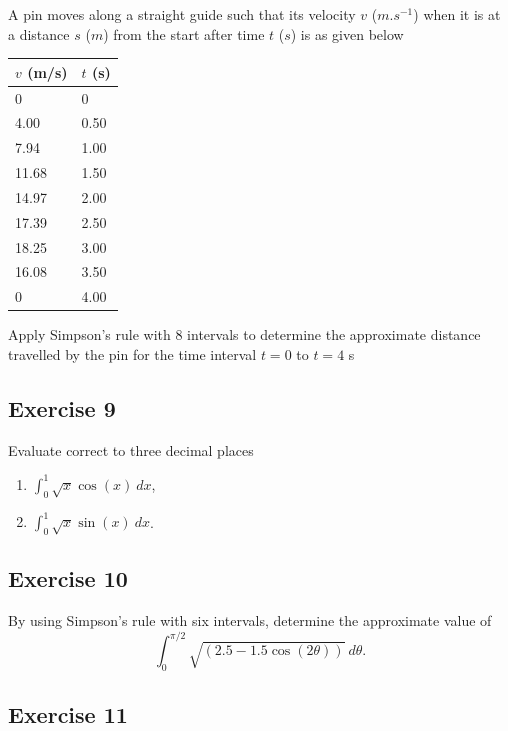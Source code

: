 \documentclass[
  11pt,
  oneside]{book}
\providecommand{\tightlist}{%
  \setlength{\itemsep}{0pt}\setlength{\parskip}{0pt}}
\newcommand{\slide}{}
\theoremstyle{definition}
\theoremstyle{definition}
\theoremstyle{definition}
\theoremstyle{definition}
\theoremstyle{remark}
\begin{document}
A pin moves along a straight guide such that its velocity \(v\) (\(m.s^{-1}\)) when it is at a distance \(s\) (\(m\)) from the start after time \(t\) (\(s\)) is as given below

\begin{tabular}{l|l}
\hline
$v$ (m/s) & $t$ (s)\\
\hline
0 & 0\\
\hline
4.00 & 0.50\\
\hline
7.94 & 1.00\\
\hline
11.68 & 1.50\\
\hline
14.97 & 2.00\\
\hline
17.39 & 2.50\\
\hline
18.25 & 3.00\\
\hline
16.08 & 3.50\\
\hline
0 & 4.00\\
\hline
\end{tabular}

Apply Simpson's rule with 8 intervals to determine the approximate distance travelled by the pin for the time interval \(t = 0\) to \(t = 4\) s

\slide

\subsection*{Exercise 9}\label{exercise-9}

Evaluate correct to three decimal places

\begin{enumerate}
\def\labelenumi{\arabic{enumi}.}
\tightlist
\item
  \(\displaystyle\int_0^1\sqrt{x}\cos(x)\ dx\),
\item
  \(\displaystyle\int_0^1\sqrt{x}\sin(x)\ dx\).
\end{enumerate}

\slide

\subsection*{Exercise 10}\label{exercise-10}

By using Simpson's rule with six intervals, determine the approximate value of
\[
\int_0^{\pi/2}\sqrt{(2.5-1.5\cos(2\theta))}\ d\theta.
\]

\slide

\subsection*{Exercise 11}\label{exercise-11}
\end{document}
